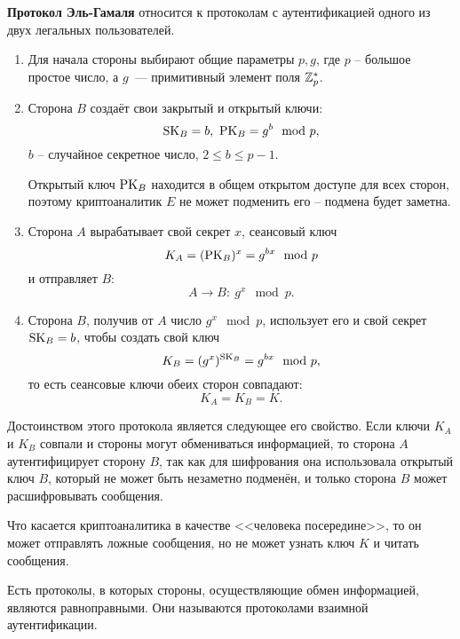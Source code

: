 \textbf{Протокол Эль-Гамаля} относится к протоколам с аутентификацией одного из двух легальных пользователей.
\begin{enumerate}
    \item Для начала стороны выбирают общие параметры $p, g$, где $p$ -- большое простое число, а $g$~--- примитивный элемент поля $\mathbb{Z}_p^*$.
    \item Сторона $B$ создаёт свои закрытый и открытый ключи:
            \[ \textrm{SK}_B = b, ~ \textrm{PK}_B = g^b \mod p, \]
        $b$ -- случайное секретное число, $2 \leq b \leq p-1$.

        Открытый ключ $\textrm{PK}_B$ находится в общем открытом доступе для всех сторон, поэтому криптоаналитик $E$ не может подменить его -- подмена будет заметна.
    \item Сторона $A$ вырабатывает свой секрет $x$, сеансовый ключ
            \[ K_A = (\textrm{PK}_B)^x = g^{bx} \mod p \]
        и отправляет $B$:
            \[ A \rightarrow B: ~ g^x \mod p. \]
    \item Сторона $B$, получив от $A$ число $g^x \mod p$, использует его и свой секрет $\textrm{SK}_B = b$, чтобы создать свой ключ
            \[ K_B = (g^x)^{\textrm{SK}_B} = g^{bx} \mod p, \]
        то есть сеансовые ключи обеих сторон совпадают:
            \[ K_A = K_B = K. \]
\end{enumerate}

Достоинством этого протокола является следующее его свойство. Если ключи $K_A$ и $K_B$ совпали и стороны могут обмениваться информацией, то сторона $A$ аутентифицирует сторону $B$, так как для шифрования она использовала открытый ключ $B$, который не может быть незаметно подменён, и только сторона $B$ может расшифровывать сообщения.

Что касается криптоаналитика в качестве <<человека посередине>>, то он может отправлять ложные сообщения, но не может узнать ключ $K$ и читать сообщения.

Есть протоколы, в которых стороны, осуществляющие обмен информацией, являются равноправными. Они называются протоколами взаимной аутентификации.
